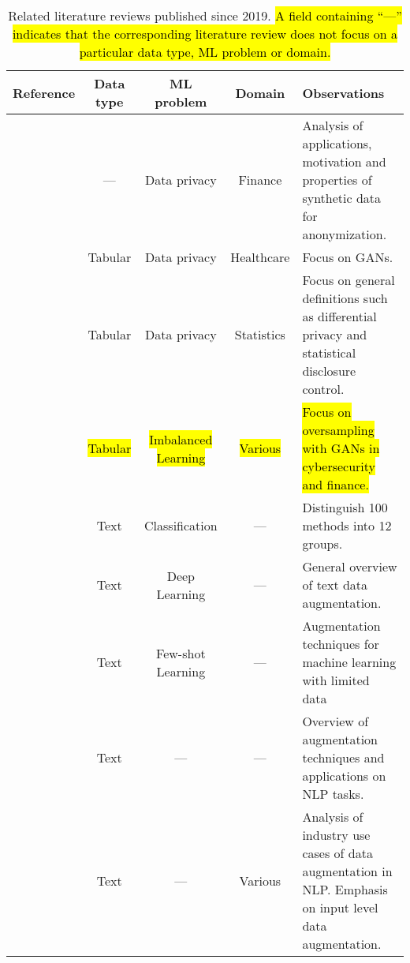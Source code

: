 \begingroup\small
\setlength\LTleft{-1.5cm}
\setlength\LTright{1.5cm}
\begin{table}[t!]
    \centering
    \caption{\label{tab:literature-reviews}
        Related literature reviews published since 2019. \hl{A field containing
        ``---'' indicates that the corresponding literature review does not
        focus on a particular data type, ML problem or domain.}
    }
    \begin{tabularx}{\textwidth}{@{}rcccX@{}}
        \toprule
        Reference & Data type & ML problem & Domain & Observations \\
        \midrule

        \cite{assefa2020generating} & --- & Data privacy &
        Finance & Analysis of applications, motivation and properties of
        synthetic data for anonymization. \\

        \cite{hernandez2022synthetic} & Tabular & Data privacy &
        Healthcare & Focus on GANs. \\

        \cite{raghunathan2021synthetic} & Tabular & Data privacy &
        Statistics & Focus on general definitions such as differential privacy
        and statistical disclosure control.\\

        \cite{sauber2022use} & \hl{Tabular} & \hl{Imbalanced Learning} &
        \hl{Various} & \hl{Focus on oversampling with GANs in cybersecurity
        and finance.}\\

        \cite{bayer2021survey} & Text & Classification & --- & Distinguish
        100 methods into 12 groups. \\

        \cite{shorten2021text} & Text & Deep Learning & --- & General
        overview of text data augmentation. \\

        \cite{chen2021empirical} & Text & Few-shot Learning & --- &
        Augmentation techniques for machine learning with limited data\\

        \cite{feng2021survey} & Text & --- & --- & Overview of augmentation
        techniques and applications on NLP tasks.\\

        \cite{liu2020survey} & Text & --- & Various & Analysis of industry
        use cases of data augmentation in NLP\@. Emphasis on input level data
        augmentation.\\


\end{tabularx}
\end{table}
